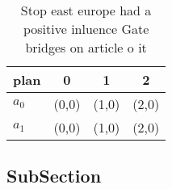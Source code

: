 \documentclass[a4paper]{article}
\begin{document}
\begin{table}
\begin{adjustbox}{width=0.5\columnwidth}
\begin{tabular}{|l|l|l|l|}
\hline
\textbf{plan} & \multicolumn{1}{c|}{\textbf{0}} & \multicolumn{1}{c|}{\textbf{1}} & \multicolumn{1}{c|}{\textbf{2}} \\ \hline
\textbf{$a_0$}  & (0,0) & (1,0) & (2,0) \\ \hline
\textbf{$a_1$}  & (0,0) & (1,0) & (2,0) \\ \hline
\end{tabular}
\end{adjustbox}
\caption{Stop east europe had a positive inluence Gate bridges on article o it
}
\end{table}

\subsection{SubSection}
\end{document}
